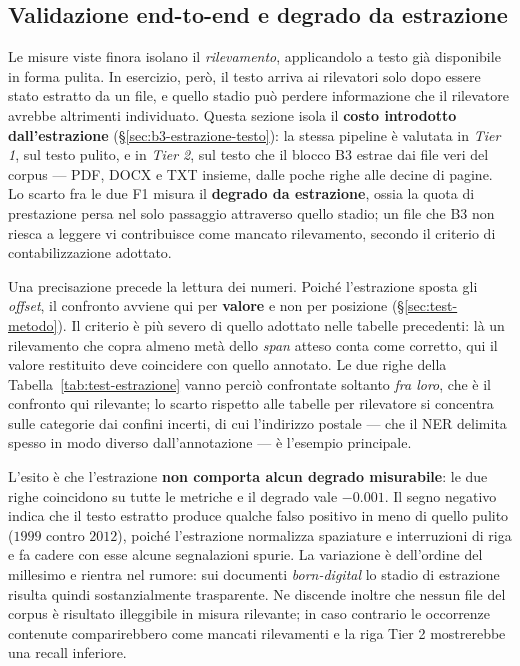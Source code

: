 \subsection{Validazione end-to-end e degrado da estrazione}
\label{sub:test-estrazione}

Le misure viste finora isolano il \emph{rilevamento}, applicandolo a testo già disponibile in forma pulita. In esercizio, però, il testo arriva ai rilevatori solo dopo essere stato estratto da un file, e quello stadio può perdere informazione che il rilevatore avrebbe altrimenti individuato. Questa sezione isola il \textbf{costo introdotto dall'estrazione} (§\ref{sec:b3-estrazione-testo}): la stessa pipeline è valutata in \emph{Tier 1}, sul testo pulito, e in \emph{Tier 2}, sul testo che il blocco B3 estrae dai file veri del corpus --- PDF, DOCX e TXT insieme, dalle poche righe alle decine di pagine. Lo scarto fra le due F1 misura il \textbf{degrado da estrazione}, ossia la quota di prestazione persa nel solo passaggio attraverso quello stadio; un file che B3 non riesca a leggere vi contribuisce come mancato rilevamento, secondo il criterio di contabilizzazione adottato.

Una precisazione precede la lettura dei numeri. Poiché l'estrazione sposta gli \textit{offset}, il confronto avviene qui per \textbf{valore} e non per posizione (§\ref{sec:test-metodo}). Il criterio è più severo di quello adottato nelle tabelle precedenti: là un rilevamento che copra almeno metà dello \textit{span} atteso conta come corretto, qui il valore restituito deve coincidere con quello annotato. Le due righe della Tabella~\ref{tab:test-estrazione} vanno perciò confrontate soltanto \emph{fra loro}, che è il confronto qui rilevante; lo scarto rispetto alle tabelle per rilevatore si concentra sulle categorie dai confini incerti, di cui l'indirizzo postale --- che il NER delimita spesso in modo diverso dall'annotazione --- è l'esempio principale.

L'esito è che l'estrazione \textbf{non comporta alcun degrado misurabile}: le due righe coincidono su tutte le metriche e il degrado vale $-0.001$. Il segno negativo indica che il testo estratto produce qualche falso positivo in meno di quello pulito ($1999$ contro $2012$), poiché l'estrazione normalizza spaziature e interruzioni di riga e fa cadere con esse alcune segnalazioni spurie. La variazione è dell'ordine del millesimo e rientra nel rumore: sui documenti \emph{born-digital} lo stadio di estrazione risulta quindi sostanzialmente trasparente. Ne discende inoltre che nessun file del corpus è risultato illeggibile in misura rilevante; in caso contrario le occorrenze contenute comparirebbero come mancati rilevamenti e la riga Tier 2 mostrerebbe una recall inferiore.

